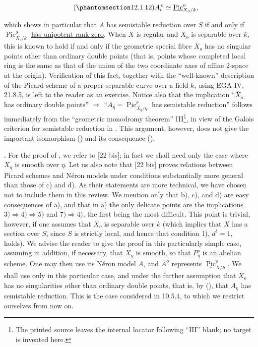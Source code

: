 \begin{equation}\tag{\SGARefTarget{sga7.sga7i.eix.n12-1-12}{12.1.12}}
 A_o^{\,o}\simeq\underline{\operatorname{Pic}}^o_{X_o/k},
\end{equation}

\noindent
which shows in particular that $A$ \underline{has semistable reduction
over $S$ if and only if}
$\underline{\operatorname{Pic}}^o_{X_o/k}$ \underline{has unipotent rank
zero}. When $X$ is regular and $X_o$ is separable over $k$, this is known
to hold if and only if the geometric special fibre $\overline X_o$ has no
singular points other than ordinary double points (that is, points whose
completed local ring is the same as that of the union of the two
coordinate axes of affine $2$-space at the origin). Verification of this
fact, together with the ``well-known'' description of the Picard scheme
of a proper separable curve over a field $k$, using EGA IV, 21.8.5, is left
to the reader as an exercise. Notice also that the implication
``$\overline X_o$ has ordinary double points'' $\Longrightarrow$
``$A_\eta=\underline{\operatorname{Pic}}^o_{X_\eta/\eta}$ has semistable
reduction'' follows immediately from the ``geometric monodromy theorem''
III\footnote{The printed source leaves the internal locator following
``III'' blank; no target is invented here.}, in view of the Galois
criterion for semistable reduction in . This argument, however, does
not give the important isomorphism () and its consequence
().

\medskip
\noindent
{}. For the proof of , we refer to [22 bis]; in fact we shall need
only the case where $X_\eta$ is smooth over $\eta$. Let us also note that
[22 bis] proves relations between Picard schemes and N\'eron models under
conditions substantially more general than those of  c) and d). As
their statements are more technical, we have chosen not to include them
in this review. We mention only that b), c), and d) are easy consequences
of a), and that in a) the only delicate points are the implications
$3)\Longrightarrow4)\Longrightarrow5)$ and $7)\Longrightarrow4)$, the
first being the most difficult. This point is trivial, however, if one
assumes that $X_o$ is separable over $k$ (which implies that $X$ has a
section over $S$, since $S$ is strictly local, and hence that condition
1), $d^t=1$, holds). We advise the reader to give the proof in this
particularly simple case, assuming in addition, if necessary, that
$X_\eta$ is smooth, so that $P_\eta^o$ is an abelian scheme. One may then
use its N\'eron model $A$, and $A^o$ represents
$\underline{\operatorname{Pic}}^o_{X/S}$. We shall use  only in this
particular case, and under the further assumption that $\overline X_o$
has no singularities other than ordinary double points, that is, by
(), that $A_\eta$ has semistable reduction. This is the case
considered in 10.5.4, to which we restrict ourselves from now on.
